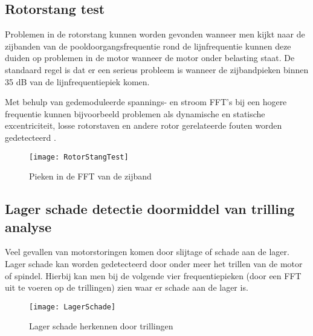\subsection{Rotorstang test}

Problemen in de rotorstang kunnen worden gevonden wanneer men kijkt naar de zijbanden van de pooldoorgangsfrequentie rond de lijnfrequentie kunnen deze duiden op problemen in de motor wanneer de motor onder belasting staat. De standaard regel is dat er een serieus probleem is wanneer de zijbandpieken binnen 35 \gls{dB} van de lijnfrequentiepiek komen. 

\vspace{0.5cm}

Met behulp van gedemoduleerde spannings- en stroom \gls{FFT}’s bij een hogere frequentie kunnen bijvoorbeeld problemen als dynamische en statische excentriciteit, losse rotorstaven en andere rotor gerelateerde fouten worden gedetecteerd \cite{web:MCSA}. 

\begin{figure}[H]
	\centering
	\texttt{[image: RotorStangTest]}
	\label{fig:RotorStangTest}
	\caption{Pieken in de \gls{FFT} van de zijband \cite{web:MCSA}}
\end{figure}

\newpage

\subsection{Lager schade detectie doormiddel van trilling analyse}

Veel gevallen van motorstoringen komen door slijtage of schade aan de lager. Lager schade kan worden gedetecteerd door onder meer het trillen van de motor of spindel. Hierbij kan men bij de volgende vier frequentiepieken (door een \gls{FFT} uit te voeren op de trillingen) zien waar er schade aan de lager is.

\begin{figure}[H]
	\centering
	\texttt{[image: LagerSchade]}
	\label{fig:LagerSchade}
	\caption{Lager schade herkennen door trillingen \cite{web:BearingFault}}
\end{figure}


